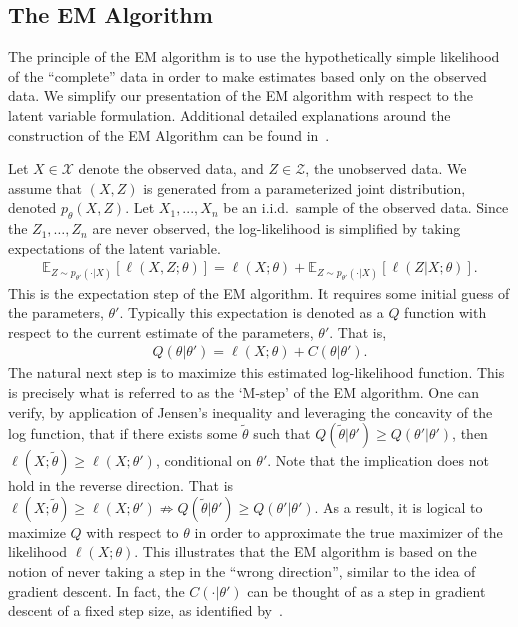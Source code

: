 \documentclass[runningheads]{llncs}
\begin{document}
\subsection{The EM Algorithm}
\label{sec:em}
The principle of the EM algorithm is to use the hypothetically simple likelihood
of the ``complete'' data in order to make estimates based only on the observed
data. We simplify our presentation of the EM algorithm with respect to the
latent variable formulation. Additional detailed explanations around the
construction of the EM Algorithm can be found
in~\cite{wu1983convergence,mclachlan2008algorithm, davison2008statistical}.

Let $X \in \mathcal{X}$ denote the observed data, and $Z \in \mathcal{Z}$, the
unobserved data. We assume that $(X,Z)$ is generated from a parameterized joint
distribution, denoted $p_\theta(X,Z)$. Let $X_1,...,X_n$ be an i.i.d.\ sample of the
observed data.
Since the $Z_1, \ldots, Z_n$ are never observed, the log-likelihood is
simplified by taking expectations of the latent variable.
\begin{align*}
  \mathbb{E}_{Z\sim p_{\theta'}(\cdot|X)}[\ell(X,Z; \theta)]
  = \ell(X; \theta) +
  \mathbb{E}_{Z\sim p_{\theta'}(\cdot|X)}[\ell(Z|X; \theta)].
\end{align*}
This is the expectation step of the EM algorithm. It requires some initial guess
of the parameters, $\theta'$.
Typically this expectation is denoted as a $Q$ function with respect to the
current estimate of the parameters, $\theta'$. That is,
\begin{align*}
Q(\theta|\theta') = \ell(X; \theta) + C(\theta|\theta').
\end{align*}
The natural next step is to maximize this estimated log-likelihood function.
This is precisely what is referred to as the `M-step' of the EM algorithm.
One can verify, by application of Jensen's inequality and leveraging the
concavity of the log function, that if there exists some $\tilde{\theta}$ such
that $Q(\tilde{\theta}|\theta') \geq Q(\theta'|\theta')$, then $\ell(X;
\tilde{\theta}) \geq \ell(X;\theta')$, conditional on $\theta'$.
Note that the implication does not hold in the reverse direction. That is
$\ell(X; \tilde{\theta}) \geq \ell(X;\theta') \nRightarrow
Q(\tilde{\theta}|\theta') \geq Q(\theta'|\theta')$. As a result, it is logical
to maximize $Q$ with respect
to $\theta$ in order to approximate the true maximizer of the likelihood
$\ell(X;\theta)$. This illustrates that the EM algorithm is based on the notion
of never taking a step in the ``wrong direction'', similar to the idea of
gradient descent. In fact, the $C(\cdot|\theta')$ can be thought of as a step in
gradient descent of a fixed step size, as identified
by~\cite{jamshidian1993conjugate}.
\end{document}
